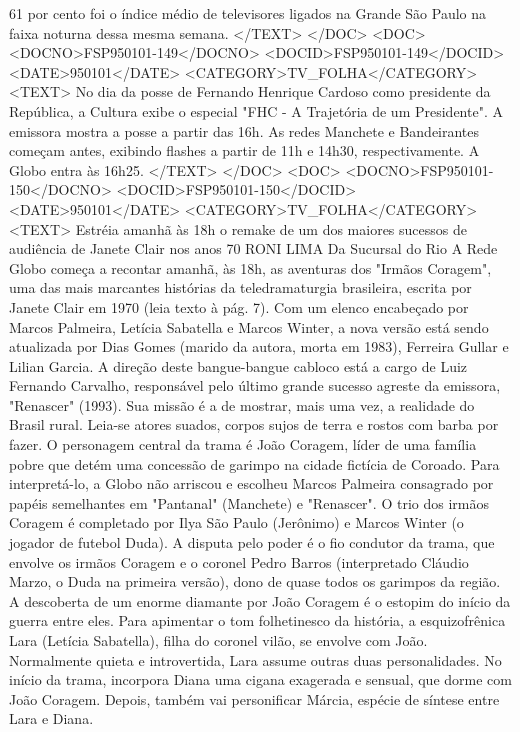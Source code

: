 61 
por cento foi o índice médio de televisores ligados na Grande São Paulo na faixa noturna dessa mesma semana.
</TEXT>
</DOC>
<DOC>
<DOCNO>FSP950101-149</DOCNO>
<DOCID>FSP950101-149</DOCID>
<DATE>950101</DATE>
<CATEGORY>TV_FOLHA</CATEGORY>
<TEXT>
No dia da posse de Fernando Henrique Cardoso como presidente da República, a Cultura exibe o especial "FHC - A Trajetória de um Presidente". A emissora mostra a posse a partir das 16h. As redes Manchete e Bandeirantes começam antes, exibindo flashes a partir de 11h e 14h30, respectivamente. A Globo entra às 16h25.
</TEXT>
</DOC>
<DOC>
<DOCNO>FSP950101-150</DOCNO>
<DOCID>FSP950101-150</DOCID>
<DATE>950101</DATE>
<CATEGORY>TV_FOLHA</CATEGORY>
<TEXT>
Estréia amanhã às 18h o remake de um dos maiores sucessos de audiência de Janete Clair nos anos 70 
RONI LIMA 
Da Sucursal do Rio 
A Rede Globo começa a recontar amanhã, às 18h, as aventuras dos "Irmãos Coragem", uma das mais marcantes histórias da teledramaturgia brasileira, escrita por Janete Clair em 1970 (leia texto à pág. 7).
Com um elenco encabeçado por Marcos Palmeira, Letícia Sabatella e Marcos Winter, a nova versão está sendo atualizada por Dias Gomes (marido da autora, morta em 1983), Ferreira Gullar e Lilian Garcia.
A direção deste bangue-bangue cabloco está a cargo de Luiz Fernando Carvalho, responsável pelo último grande sucesso agreste da emissora, "Renascer" (1993).
Sua missão é a de mostrar, mais uma vez, a realidade do Brasil rural. Leia-se atores suados, corpos sujos de terra e rostos com barba por fazer.
O personagem central da trama é João Coragem, líder de uma família pobre que detém uma concessão de garimpo na cidade fictícia de Coroado.
Para interpretá-lo, a Globo não arriscou e escolheu Marcos Palmeira consagrado por papéis semelhantes em "Pantanal" (Manchete) e "Renascer".
O trio dos irmãos Coragem é completado por Ilya São Paulo (Jerônimo) e Marcos Winter (o jogador de futebol Duda).
A disputa pelo poder é o fio condutor da trama, que envolve os irmãos Coragem e o coronel Pedro Barros (interpretado Cláudio Marzo, o Duda na primeira versão), dono de quase todos os garimpos da região.
A descoberta de um enorme diamante por João Coragem é o estopim do início da guerra entre eles.
Para apimentar o tom folhetinesco da história, a esquizofrênica Lara (Letícia Sabatella), filha do coronel vilão, se envolve com João.
Normalmente quieta e introvertida, Lara assume outras duas personalidades. No início da trama, incorpora Diana uma cigana exagerada e sensual, que dorme com João Coragem. Depois, também vai personificar Márcia, espécie de síntese entre Lara e Diana.
